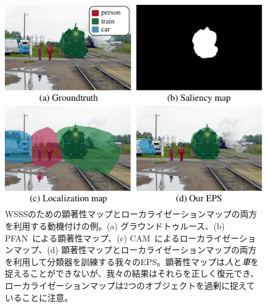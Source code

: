 \begin{figure}[t]
\centering
\includegraphics[width=8 cm]{figures/fig_concept.pdf}
\caption{WSSSのための顕著性マップとローカライゼーションマップの両方を利用する動機付けの例。(a) グラウンドトゥルース、(b) PFAN~\cite{zhao2019pyramid}による顕著性マップ、(c) CAM~\cite{zhou2016learning}によるローカライゼーションマップ、(d) 顕著性マップとローカライゼーションマップの両方を利用して分類器を訓練する我々のEPS。顕著性マップは\emph{人}と\emph{車}を捉えることができないが、我々の結果はそれらを正しく復元でき、ローカライゼーションマップは2つのオブジェクトを過剰に捉えていることに注意。} \vspace{-2mm}
\label{fig:concept}
\end{figure}
